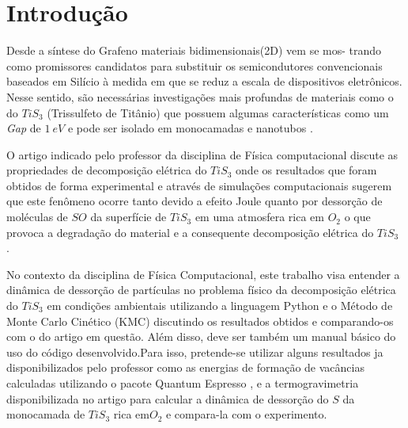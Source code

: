 \documentclass[12pt]{elsarticle}
\begin{document}

\section{Introdução}
\label{S:1}
Desde a síntese do Grafeno \cite{geim2010rise} materiais bidimensionais(2D) vem se mos- \linebreak trando como promissores candidatos para substituir os semicondutores convencionais baseados em Silício à medida em que se reduz a escala de dispositivos eletrônicos. Nesse sentido, são necessárias investigações mais profundas de materiais como o do $TiS_3$ (Trissulfeto de Titânio) que possuem algumas características como um  \textit{Gap} de $1~eV$ e pode ser isolado em monocamadas e nanotubos \cite{molina2017high}. 

O artigo indicado pelo professor da disciplina de Física computacional \cite{molina2017high} discute as propriedades de decomposição elétrica do $TiS_3$ onde os resultados que foram obtidos de forma experimental e através de simulações computacionais sugerem que este fenômeno ocorre tanto devido a efeito Joule quanto por dessorção de moléculas de $SO$ da superfície de $TiS_3$ em uma atmosfera rica em $O_2$ o que provoca a degradação do material e a consequente decomposição elétrica do $TiS_3$ .  

No contexto da disciplina de Física Computacional, este trabalho visa entender a dinâmica de dessorção de partículas no problema físico da decomposição elétrica do $TiS_3$ em condições ambientais utilizando a linguagem Python e o Método de Monte Carlo Cinético (KMC) discutindo os resultados obtidos e comparando-os com o do artigo em questão\cite{molina2017high}. Além disso, deve ser também um manual básico do uso do código desenvolvido.Para isso, pretende-se utilizar alguns resultados ja disponibilizados pelo professor como as energias de formação de vacâncias calculadas utilizando o pacote Quantum Espresso\cite{giannozzi2009quantum} , e a termogravimetria disponibilizada no artigo\cite{molina2017high} para calcular a dinâmica de dessorção do $S$ da monocamada de $TiS_3$ rica em$ O_2$ e compara-la com o experimento.

% 
\end{document}
